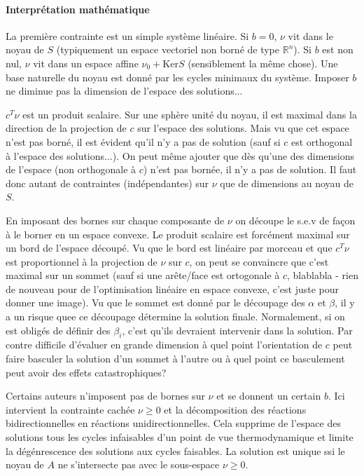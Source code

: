 \paragraph{Interprétation mathématique} La première contrainte est un simple système linéaire. Si $b=0$, $\nu$ vit dans le noyau de $S$ (typiquement un espace vectoriel non borné de type $\mathbb{R}^n$). Si $b$ est non nul, $\nu$ vit dans un espace affine $\nu_0 + \mathrm{Ker}S$ (sensiblement la même chose). Une base naturelle du noyau est donné par les cycles minimaux du système. Imposer $b$ ne diminue pas la dimension de l'espace des solutions...

$c^T\nu$ est un produit scalaire. Sur une sphère unité du noyau, il est maximal dans la direction de la projection de $c$ sur l'espace des solutions. Mais vu que cet espace n'est pas borné, il est évident qu'il n'y a pas de solution (sauf si $c$ est orthogonal à l'espace des solutions...). On peut même ajouter que dès qu'une des dimensions de l'espace (non orthogonale à $c$) n'est pas bornée, il n'y a pas de solution. Il faut donc autant de contraintes (indépendantes) sur $\nu$ que de dimensions au noyau de $S$.

En imposant des bornes sur chaque composante de $\nu$ on découpe le s.e.v de façon à le borner en un espace convexe. Le produit scalaire est forcément maximal sur un bord de l'espace découpé. Vu que le bord est linéaire par morceau et que $c^T\nu$ est proportionnel à la projection de $\nu$ sur $c$, on peut se convaincre que c'est maximal sur un sommet (sauf si une arête/face est ortogonale à $c$, blablabla - rien de nouveau pour de l'optimisation linéaire en espace convexe, c'est juste pour donner une image). Vu que le sommet est donné par le découpage des $\alpha$ et $\beta$, il y a un risque quee ce découpage détermine la solution finale. Normalement, si on est obligés de définir des $\beta_i$, c'est qu'ils devraient intervenir dans la solution. Par contre difficile d'évaluer en grande dimension à quel point l'orientation de $c$ peut faire basculer la solution d'un sommet à l'autre ou à quel point ce basculement peut avoir des effets catastrophiques?

Certains auteurs n'imposent pas de bornes sur $\nu$ \citep{varma_metabolic_1993, varma_metabolic_1993-1} et se donnent un certain $b$. Ici intervient la contrainte cachée $\nu \geq 0$ et la décomposition des réactions bidirectionnelles en réactions unidirectionnelles. Cela supprime de l'espace des solutions tous les cycles infaisables d'un point de vue thermodynamique et limite la dégénrescence des solutions aux cycles faisables. La solution est unique ssi le noyau de $A$ ne s'intersecte pas avec le sous-espace $\nu \geq 0$. 

